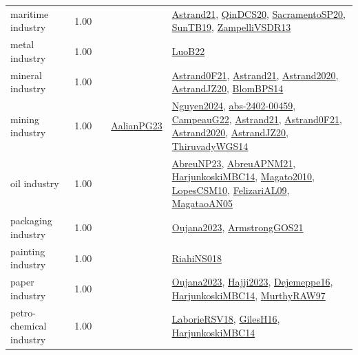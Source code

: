 {\begin{longtable}{p{3cm}r>{\raggedright\arraybackslash}p{6cm}>{\raggedright\arraybackslash}p{6cm}>{\raggedright\arraybackslash}p{8cm}}
\index{maritime industry}\index{Industries!maritime industry}maritime industry &  1.00 &  &  & \hyperref[detail:Astrand21]{Astrand21}, \hyperref[detail:QinDCS20]{QinDCS20}, \hyperref[detail:SacramentoSP20]{SacramentoSP20}, \hyperref[detail:SunTB19]{SunTB19}, \hyperref[detail:ZampelliVSDR13]{ZampelliVSDR13}\\
\index{metal industry}\index{Industries!metal industry}metal industry &  1.00 &  &  & \hyperref[detail:LuoB22]{LuoB22}\\
\index{mineral industry}\index{Industries!mineral industry}mineral industry &  1.00 &  &  & \hyperref[detail:Astrand0F21]{Astrand0F21}, \hyperref[detail:Astrand21]{Astrand21}, \hyperref[detail:Astrand2020]{Astrand2020}, \hyperref[detail:AstrandJZ20]{AstrandJZ20}, \hyperref[detail:BlomBPS14]{BlomBPS14}\\
\index{mining industry}\index{Industries!mining industry}mining industry &  1.00 &  & \hyperref[detail:AalianPG23]{AalianPG23} & \hyperref[detail:Nguyen2024]{Nguyen2024}, \hyperref[detail:abs-2402-00459]{abs-2402-00459}, \hyperref[detail:CampeauG22]{CampeauG22}, \hyperref[detail:Astrand21]{Astrand21}, \hyperref[detail:Astrand0F21]{Astrand0F21}, \hyperref[detail:Astrand2020]{Astrand2020}, \hyperref[detail:AstrandJZ20]{AstrandJZ20}, \hyperref[detail:ThiruvadyWGS14]{ThiruvadyWGS14}\\
\index{oil industry}\index{Industries!oil industry}oil industry &  1.00 &  &  & \hyperref[detail:AbreuNP23]{AbreuNP23}, \hyperref[detail:AbreuAPNM21]{AbreuAPNM21}, \hyperref[detail:HarjunkoskiMBC14]{HarjunkoskiMBC14}, \hyperref[detail:Magato2010]{Magato2010}, \hyperref[detail:LopesCSM10]{LopesCSM10}, \hyperref[detail:FelizariAL09]{FelizariAL09}, \hyperref[detail:MagataoAN05]{MagataoAN05}\\
\index{packaging industry}\index{Industries!packaging industry}packaging industry &  1.00 &  &  & \hyperref[detail:Oujana2023]{Oujana2023}, \hyperref[detail:ArmstrongGOS21]{ArmstrongGOS21}\\
\index{painting industry}\index{Industries!painting industry}painting industry &  1.00 &  &  & \hyperref[detail:RiahiNS018]{RiahiNS018}\\
\index{paper industry}\index{Industries!paper industry}paper industry &  1.00 &  &  & \hyperref[detail:Oujana2023]{Oujana2023}, \hyperref[detail:Hajji2023]{Hajji2023}, \hyperref[detail:Dejemeppe16]{Dejemeppe16}, \hyperref[detail:HarjunkoskiMBC14]{HarjunkoskiMBC14}, \hyperref[detail:MurthyRAW97]{MurthyRAW97}\\
\index{petro-chemical industry}\index{Industries!petro-chemical industry}petro-chemical industry &  1.00 &  &  & \hyperref[detail:LaborieRSV18]{LaborieRSV18}, \hyperref[detail:GilesH16]{GilesH16}, \hyperref[detail:HarjunkoskiMBC14]{HarjunkoskiMBC14}\\

\end{longtable}}
